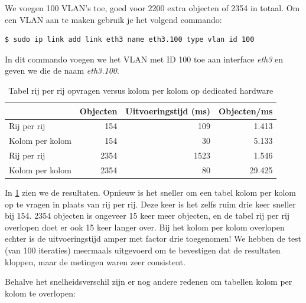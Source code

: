 We voegen 100 VLAN's toe, goed voor 2200 extra objecten of 2354 in totaal.
Om een VLAN aan te maken gebruik je het volgend commando:

\begin{lstlisting}[caption={Aanmaken van een VLAN}, label=commando-vlan]
$ sudo ip link add link eth3 name eth3.100 type vlan id 100
\end{lstlisting}

In dit commando voegen we het VLAN met ID 100 toe aan interface \textit{eth3} en geven we die de naam \textit{eth3.100}.

\begin{table}[h]
\centering
\begin{tabular}{@{}lrrr@{}}
\toprule
                & Objecten & Uitvoeringstijd (ms) & Objecten/ms \\ \midrule
Rij per rij     & 154      & 109                  & 1.413       \\
Kolom per kolom & 154      & 30                   & 5.133       \\
Rij per rij     & 2354     & 1523                 & 1.546       \\
Kolom per kolom & 2354     & 80                   & 29.425      \\ \bottomrule
\end{tabular}
\caption{Tabel rij per rij opvragen versus kolom per kolom op dedicated hardware}
\label{tabel-serieel-vs-parallel-vwall}
\end{table}

In \cref{tabel-serieel-vs-parallel-vwall} zien we de resultaten.
Opnieuw is het sneller om een tabel kolom per kolom op te vragen in plaats van rij per rij.
Deze keer is het zelfs ruim drie keer sneller bij 154.
2354 objecten is ongeveer 15 keer meer objecten, en de tabel rij per rij overlopen doet er ook 15 keer langer over.
Bij het kolom per kolom overlopen echter is de uitvoeringstijd amper met factor drie toegenomen!
We hebben de test (van 100 iteraties) meermaals uitgevoerd om  te bevestigen dat de resultaten kloppen,
maar de metingen waren zeer consistent.


Behalve het snelheidsverschil zijn er nog andere redenen om tabellen kolom per kolom te overlopen:

